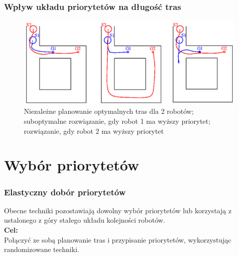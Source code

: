 \subsubsection{Wpływ układu priorytetów na długość tras}
\begin{figure}[htp]
	\centering
	\includegraphics[width=\textwidth,height=0.6\textheight,keepaspectratio]{img/article1/ppt6}
	\caption{Niezależne planowanie optymalnych tras dla 2 robotów; suboptymalne rozwiązanie, gdy robot 1 ma wyższy priorytet; rozwiązanie, gdy robot 2 ma wyższy priorytet}
\end{figure}

\section{Wybór priorytetów}
\subsubsection{Elastyczny dobór priorytetów}
Obecne techniki pozostawiają dowolny wybór priorytetów lub korzystają z ustalonego z góry stałego układu kolejności robotów. \\
\vspace{1em}
{\bf Cel:} \\
Połączyć ze sobą planowanie tras i przypisanie priorytetów, wykorzystując randomizowane techniki.

